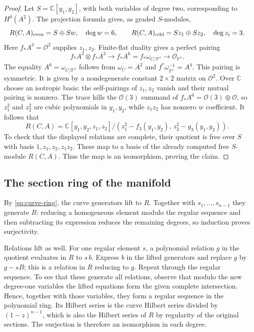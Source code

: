\documentclass[11pt,reqno,letterpaper]{amsart}
\newcommand{\C}{\mathbb C}
\newcommand{\PP}{\mathbb P}
\newcommand{\OO}{\mathcal O}
\theoremstyle{definition}
\numberwithin{equation}{section}
\begin{document}
\begin{proof}
Let $S=\C[y_1,y_2]$, with both variables of degree two, corresponding to
$H^0(A^2)$. The projection formula gives, as graded $S$-modules,
\[
 R(C,A)_{\rm even}=S\oplus S w,\quad \deg w=6,\qquad
 R(C,A)_{\rm odd}=S z_1\oplus S z_2,\quad\deg z_i=3.
\]
Here $f_*A^3=\OO^2$ supplies $z_1,z_2$.
Finite-flat duality gives a perfect pairing
\[
 f_*A^3\otimes f_*A^3\longrightarrow
 f_*A^6=f_*\omega_{C/\PP^1}\longrightarrow\OO_{\PP^1}.
\]
The equality $A^6=\omega_{C/\PP^1}$ follows from
$\omega_C=A^2$ and $f^*\omega_{\PP^1}^{-1}=A^4$.
This pairing is symmetric. It is given by a nondegenerate constant
$2\times2$ matrix on $\OO^2$.
Over $\C$ choose an isotropic basis: the self-pairings of $z_1,z_2$
vanish and their mutual pairing is nonzero.
The trace kills the $\OO(3)$ summand of $f_*A^6=\OO(3)\oplus\OO$,
so $z_1^2$ and $z_2^2$ are cubic polynomials in $y_1,y_2$,
while $z_1z_2$ has nonzero $w$ coefficient.
It follows that
\[
 R(C,A)=\C[y_1,y_2,z_1,z_2]/
        (z_1^2-f_3(y_1,y_2),\,z_2^2-g_3(y_1,y_2)).
\]
To check that the displayed relations are complete, their quotient is free
over $S$ with basis $1,z_1,z_2,z_1z_2$.
These map to a basis of the already computed free $S$-module $R(C,A)$.
Thus the map is an isomorphism, proving the claim.
\end{proof}

\subsection{The section ring of the manifold}
By \eqref{eq:curve-ring}, the curve generators lift to $R$.
Together with $s_1,\ldots,s_{n-1}$ they generate $R$: reducing a homogeneous
element modulo the regular sequence and then subtracting its expression
reduces the remaining degrees, so induction proves surjectivity.

Relations lift as well. For one regular element $s$, a polynomial relation
$g$ in the quotient evaluates in $R$ to $s\,b$.
Express $b$ in the lifted generators and replace $g$ by $g-sB$;
this is a relation in $R$ reducing to $g$.
Repeat through the regular sequence.
To see that these generate all relations, observe that modulo the new degree-one variables the
lifted equations form the given complete intersection. Hence, together
with those variables, they form a regular sequence in the polynomial ring.
Its Hilbert series is the curve Hilbert series divided by $(1-z)^{n-1}$,
which is also the Hilbert series of $R$ by regularity of the original
sections. The surjection is therefore an isomorphism in each degree.
\end{document}
